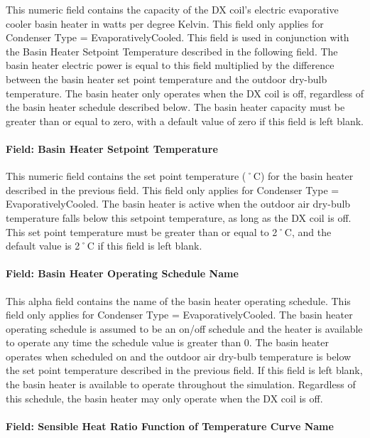 This numeric field contains the capacity of the DX coil's electric evaporative cooler basin heater in watts per degree Kelvin. This field only applies for Condenser Type = EvaporativelyCooled. This field is used in conjunction with the Basin Heater Setpoint Temperature described in the following field. The basin heater electric power is equal to this field multiplied by the difference between the basin heater set point temperature and the outdoor dry-bulb temperature. The basin heater only operates when the DX coil is off, regardless of the basin heater schedule described below. The basin heater capacity must be greater than or equal to zero, with a default value of zero if this field is left blank.

\paragraph{Field: Basin Heater Setpoint Temperature}\label{field-basin-heater-setpoint-temperature-1-000}

This numeric field contains the set point temperature (˚C) for the basin heater described in the previous field. This field only applies for Condenser Type = EvaporativelyCooled. The basin heater is active when the outdoor air dry-bulb temperature falls below this setpoint temperature, as long as the DX coil is off. This set point temperature must be greater than or equal to 2˚C, and the default value is 2˚C if this field is left blank.

\paragraph{Field: Basin Heater Operating Schedule Name}\label{field-basin-heater-operating-schedule-name-1-000}

This alpha field contains the name of the basin heater operating schedule. This field only applies for Condenser Type = EvaporativelyCooled. The basin heater operating schedule is assumed to be an on/off schedule and the heater is available to operate any time the schedule value is greater than 0. The basin heater operates when scheduled on and the outdoor air dry-bulb temperature is below the set point temperature described in the previous field. If this field is left blank, the basin heater is available to operate throughout the simulation. Regardless of this schedule, the basin heater may only operate when the DX coil is off.

\paragraph{Field: Sensible Heat Ratio Function of Temperature Curve Name}\label{field-sensible-heat-ratio-function-of-temperature-curve-name-1}

